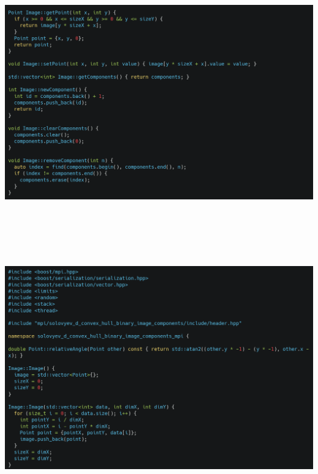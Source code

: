 \documentclass[a4paper]{article}
\begin{document}
\begin{center}
\includegraphics[width=481.95pt,height=304.61pt]{report-img003.png}
\end{center}
\begin{center}
\includegraphics[width=481.95pt,height=318.1pt]{report-img004.png}
\end{center}
\end{document}
